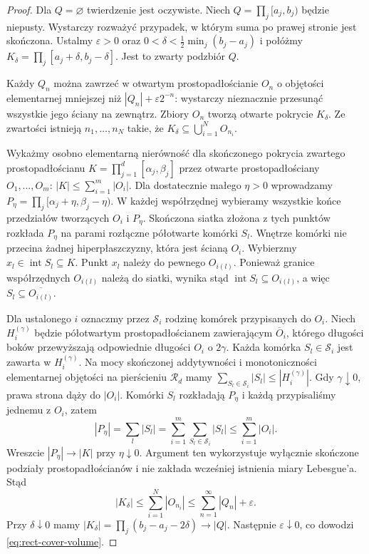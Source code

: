 \begin{proof}
Dla $Q=\varnothing$ twierdzenie jest oczywiste.
Niech $Q=\prod_j[a_j,b_j)$ będzie niepusty.
Wystarczy rozważyć przypadek, w którym suma po prawej
stronie jest skończona. Ustalmy $\varepsilon>0$ oraz
$0<\delta<\frac12\min_j(b_j-a_j)$ i połóżmy
$K_\delta=\prod_j[a_j+\delta,b_j-\delta]$.
Jest to zwarty podzbiór $Q$.

Każdy $Q_n$ można zawrzeć w otwartym prostopadłościanie
$O_n$ o objętości elementarnej mniejszej niż
$|Q_n|+\varepsilon2^{-n}$: wystarczy nieznacznie
przesunąć wszystkie jego ściany na zewnątrz.
Zbiory $O_n$ tworzą otwarte pokrycie $K_\delta$.
Ze zwartości istnieją $n_1,\ldots,n_N$ takie, że
$K_\delta\subseteq\bigcup_{i=1}^N O_{n_i}$.

Wykażmy osobno elementarną nierówność dla skończonego
pokrycia zwartego prostopadłościanu
$K=\prod_{j=1}^d[\alpha_j,\beta_j]$ przez otwarte
prostopadłościany $O_1,\ldots,O_m$:
$|K|\le\sum_{i=1}^m|O_i|$.
Dla dostatecznie małego $\eta>0$ wprowadzamy
$P_\eta=\prod_j[\alpha_j+\eta,\beta_j-\eta)$.
W każdej współrzędnej wybieramy wszystkie końce
przedziałów tworzących $O_i$ i $P_\eta$.
Skończona siatka złożona z tych punktów rozkłada
$P_\eta$ na parami rozłączne półotwarte komórki $S_l$.
Wnętrze komórki nie przecina żadnej hiperpłaszczyzny,
która jest ścianą $O_i$. Wybierzmy
$x_l\in\operatorname{int}S_l\subseteq K$.
Punkt $x_l$ należy do pewnego $O_{i(l)}$.
Ponieważ granice współrzędnych $O_{i(l)}$ należą do
siatki, wynika stąd
$\operatorname{int}S_l\subseteq O_{i(l)}$, a więc
$S_l\subseteq\overline{O_{i(l)}}$.

Dla ustalonego $i$ oznaczmy przez $\mathcal S_i$ rodzinę
komórek przypisanych do $O_i$. Niech $H_i^{(\gamma)}$
będzie półotwartym prostopadłościanem zawierającym
$\overline O_i$, którego długości boków przewyższają
odpowiednie długości $O_i$ o $2\gamma$.
Każda komórka $S_l\in\mathcal S_i$ jest zawarta w
$H_i^{(\gamma)}$. Na mocy skończonej addytywności
i monotoniczności elementarnej objętości na pierścieniu
$\mathcal R_d$ mamy
$\sum_{S_l\in\mathcal S_i}|S_l|
\le |H_i^{(\gamma)}|$.
Gdy $\gamma\downarrow0$, prawa strona dąży do $|O_i|$.
Komórki $S_l$ rozkładają $P_\eta$ i każdą przypisaliśmy
jednemu z $O_i$, zatem
\[
 |P_\eta|=\sum_l|S_l|
 =\sum_{i=1}^m\sum_{S_l\in\mathcal S_i}|S_l|
 \le\sum_{i=1}^m|O_i|.
\]
Wreszcie $|P_\eta|\to|K|$ przy $\eta\downarrow0$.
Argument ten wykorzystuje wyłącznie skończone podziały
prostopadłościanów i nie zakłada wcześniej istnienia miary
Lebesgue'a.
Stąd
\[
|K_\delta|\le\sum_{i=1}^N|O_{n_i}|
\le\sum_{n=1}^\infty|Q_n|+\varepsilon.
\]
Przy $\delta\downarrow0$ mamy
$|K_\delta|=\prod_j(b_j-a_j-2\delta)\to|Q|$.
Następnie $\varepsilon\downarrow0$, co dowodzi
\eqref{eq:rect-cover-volume}.
\end{proof}

